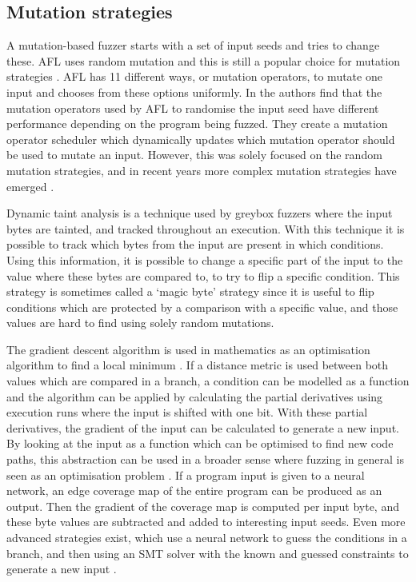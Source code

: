 \subsection{Mutation strategies}\label{subsec:mutation-strategies}
A mutation-based fuzzer starts with a set of input seeds and tries to change these. AFL uses random mutation and this is still a popular choice for mutation strategies \cite{rawat2017vuzzer, chen2018angora, aflfuzzer}. AFL has 11 different ways, or mutation operators, to mutate one input and chooses from these options uniformly.
In \cite{lyu2019mopt} the authors find that the mutation operators used by AFL to randomise the input seed have different performance depending on the program being fuzzed. They create a mutation operator scheduler which dynamically updates which mutation operator should be used to mutate an input. However, this was solely focused on the random mutation strategies, and in recent years more complex mutation strategies have emerged \cite{she2019neuzz, shen2019neuro, yun2018qsym, chen2018angora}. 

Dynamic taint analysis \cite{rawat2017vuzzer} is a technique used by greybox fuzzers where the input bytes are tainted, and tracked throughout an execution. With this technique it is possible to track which bytes from the input are present in which conditions. Using this information, it is possible to change a specific part of the input to the value where these bytes are compared to, to try to flip a specific condition. This strategy is sometimes called a `magic byte' strategy since it is useful to flip conditions which are protected by a comparison with a specific value, and those values are hard to find using solely random mutations.

The gradient descent algorithm is used in mathematics as an optimisation algorithm to find a local minimum \cite{ruder2016overview}. If a distance metric is used between both values which are compared in a branch, a condition can be modelled as a function and the algorithm can be applied \cite{chen2018angora} by calculating the partial derivatives using execution runs where the input is shifted with one bit. With these partial derivatives, the gradient of the input can be calculated to generate a new input.
By looking at the input as a function which can be optimised to find new code paths, this abstraction can be used in a broader sense where fuzzing in general is seen as an optimisation problem \cite{she2019neuzz}. If a program input is given to a neural network, an edge coverage map of the entire program can be produced as an output. Then the gradient of the coverage map is computed per input byte, and these byte values are subtracted and added to interesting input seeds.
Even more advanced strategies exist, which use a neural network to guess the conditions in a branch, and then using an SMT solver with the known and guessed constraints to generate a new input \cite{shen2019neuro}.

